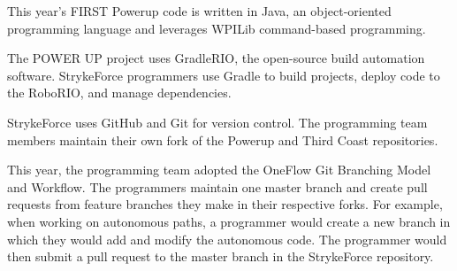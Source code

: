 \documentclass[10pt,tumble]{leaflet}
\begin{document}
This year’s FIRST Powerup code is written in Java, an object-oriented programming language and leverages WPILib command-based programming.

The POWER UP project uses GradleRIO, the open-source build automation software.  StrykeForce programmers use Gradle to build projects, deploy code to the RoboRIO, and manage dependencies.

StrykeForce uses GitHub and Git for version control.  The programming team members maintain their own fork of the Powerup and Third Coast repositories.

This year, the programming team adopted the OneFlow Git Branching Model and Workflow.  The programmers maintain one master branch and create pull requests from feature branches they make in their respective forks.  For example, when working on autonomous paths, a programmer would create a new branch in which they would add and modify the autonomous code.  The programmer would then submit a pull request to the master branch in the StrykeForce repository.
\end{document}
